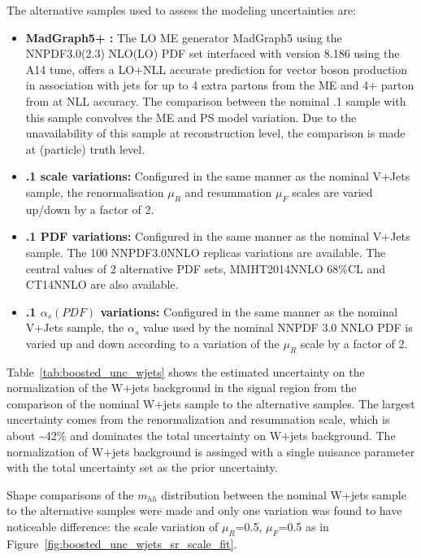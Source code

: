 The alternative samples used to assess the modeling uncertainties are:
 
\begin{itemize}
\item \textbf{MadGraph5+ :} The LO ME generator MadGraph5 using the NNPDF3.0(2.3) NLO(LO) PDF set interfaced
with  version 8.186 using the A14 tune, offers a LO+NLL accurate prediction for vector boson production in association
with jets for up to 4 extra partons from the ME and 4+ parton from  at NLL accuracy. The comparison between the nominal  
.1 sample with this sample convolves the ME and PS model variation. Due to the unavailability of this sample at
reconstruction level, the comparison is made at (particle) truth level.
 
\item \textbf{.1 scale variations:} Configured in the same manner as the nominal V+Jets sample,
the renormalisation $\mu_{R}$ and resummation $\mu_{F}$ scales are varied up/down by a factor of 2.
 
\item \textbf{.1 PDF variations:} Configured in the same manner as the nominal V+Jets sample. The
100 NNPDF3.0NNLO replicas variations are available. The central values of 2 alternative PDF sets, MMHT2014NNLO 68\%CL and CT14NNLO
are also available.
 
\item \textbf{.1 $\alpha_{s}(PDF)$ variations:} Configured in the same manner as the nominal V+Jets sample,
the $\alpha_{s}$ value used by the nominal NNPDF 3.0 NNLO PDF is varied up and down according to a variation of
the $\mu_{R}$ scale by a factor of 2.
\end{itemize}
 
Table~\ref{tab:boosted_unc_wjets} shows the estimated uncertainty on the normalization of the W+jets background in the signal region
from the comparison of the nominal W+jets sample to the alternative samples.  The largest uncertainty comes from the renormalization
and resummation scale, which is about \textasciitilde42\% and dominates the total uncertainty on W+jets background. The normalization of W+jets
background is assinged with a single nuisance parameter with the total uncertainty set as the prior uncertainty.
 
Shape comparisons of the $m_{hh}$ distribution between the nominal W+jets sample to the alternative samples were made and only one
variation was found to have noticeable difference: the scale variation of $\mu_{R}$=0.5, $\mu_{F}$=0.5 as in Figure~\ref{fig:boosted_unc_wjets_sr_scale_fit}.
 
